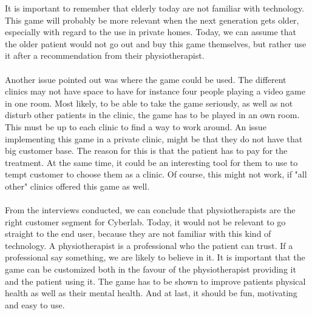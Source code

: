 It is important to remember that elderly today are not familiar with technology. This game will probably be more relevant when the next generation gets older, especially with regard to the use in private homes. Today, we can assume that the older patient would not go out and buy this game themselves, but rather use it after a recommendation from their physiotherapist. \\ \\
Another issue pointed out was where the game could be used. The different clinics may not have space to have for instance four people playing a video game in one room. Most likely, to be able to take the game seriously, as well as not disturb other patients in the clinic, the game has to be played in an own room. This must be up to each clinic to find a way to work around. An issue implementing this game in a private clinic, might be that they do not have that big customer base. The reason for this is that the patient has to pay for the treatment. At the same time, it could be an interesting tool for them to use to tempt customer to choose them as a clinic. Of course, this might not work, if "all other" clinics offered this game as well. \\ \\
From the interviews conducted, we can conclude that physiotherapists are the right customer segment for Cyberlab. Today, it would not be relevant to go straight to the end user, because they are not familiar with this kind of technology. A physiotherapist is a professional who the patient can trust. If a professional say something, we are likely to believe in it.  It is important that the game can be customized both in the favour of the physiotherapist providing it and the patient using it. The game has to be shown to improve patients physical health as well as their mental health. And at last, it should be fun, motivating and easy to use. 

